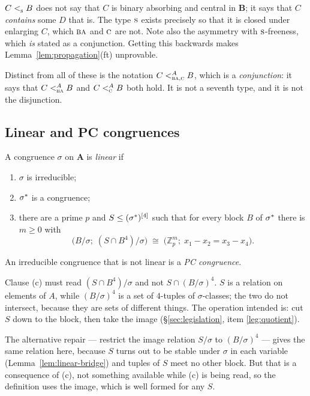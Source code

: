 \begin{hazard}\label{haz:S-type}
$C\subt{\TS}B$ does not say that $C$ is binary absorbing and central in
$\mathbf B$; it says that $C$ \emph{contains} some $D$ that is. The type
$\TS$ exists precisely so that it is closed under enlarging $C$, which
$\TBA$ and $\TC$ are not. Note also the asymmetry with $\TS$-freeness, which
\emph{is} stated as a conjunction. Getting this backwards makes
Lemma~\ref{lem:propagation}(ft) unprovable.

Distinct from all of these is the notation $C\subt[A]{\TBA,\TC}B$, which is a
\emph{conjunction}: it says that $C\subt[A]{\TBA}B$ and $C\subt[A]{\TC}B$
both hold. It is not a seventh type, and it is not the disjunction.
\end{hazard}

\subsection{Linear and PC congruences}

\begin{definition}\label{def:linear-congruence}
A congruence $\sigma$ on $\mathbf A$ is \emph{linear} if
\begin{enumerate}\alphlabels\tightlist
\item $\sigma$ is irreducible;
\item $\cover{\sigma}$ is a congruence;
\item there are a prime $p$ and $S\le(\cover{\sigma})^{[4]}$ such that for
  every block $B$ of $\cover{\sigma}$ there is $m\ge 0$ with
  \[
    \bigl(B/\sigma;\;(S\cap B^{4})/\sigma\bigr)\;\cong\;
    \bigl(\mathbb Z_{p}^{m};\;x_{1}-x_{2}=x_{3}-x_{4}\bigr).
  \]
\end{enumerate}
An irreducible congruence that is not linear is a \emph{PC congruence}.
\end{definition}

\begin{hazard}\label{haz:linear-typing}
Clause (c) must read $(S\cap B^{4})/\sigma$ and not $S\cap(B/\sigma)^{4}$. $S$
is a relation on elements of $A$, while $(B/\sigma)^{4}$ is a set of
$4$-tuples of $\sigma$-classes; the two do not intersect, because they are sets
of different things. The operation intended is: cut $S$ down to the block, then
take the image (\S\ref{sec:legislation}, item \ref{leg:quotient}).

The alternative repair --- restrict the image relation $S/\sigma$ to
$(B/\sigma)^{4}$ --- gives the same relation here, because $S$ turns out to be
stable under $\sigma$ in each variable (Lemma~\ref{lem:linear-bridge}) and
tuples of $S$ meet no other block. But that is a consequence of (c), not
something available while (c) is being read, so the definition uses the image,
which is well formed for any $S$.
\end{hazard}

